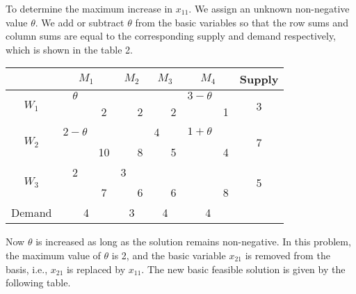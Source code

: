 \documentclass[../main-sheet.tex]{subfiles}
\begin{document}
To determine the maximum increase in \(x_{11}\). We assign an unknown non-negative value \(\theta\). We add or subtract \(\theta\) from the basic variables so that the row sums and column sums are equal to the corresponding supply and demand respectively, which is shown in the table 2.
\begin{table}[H]
    \centering
    \begin{tabular}{|c|cc|cc|cc|cc|c|}
    \hline
                           & \multicolumn{2}{c|}{$M_1$} & \multicolumn{2}{c|}{$M_2$} & \multicolumn{2}{c|}{$M_3$} & \multicolumn{2}{c|}{$M_4$} & Supply             \\ \hline
    \multirow{2}{*}{$W_1$} & $\theta$              &    &                        &   &                        &   & $3-\theta$             &   & \multirow{2}{*}{3} \\ \cline{3-3} \cline{5-5} \cline{7-7} \cline{9-9}
                           & \multicolumn{1}{c|}{} & 2  & \multicolumn{1}{c|}{}  & 2 & \multicolumn{1}{c|}{}  & 2 & \multicolumn{1}{c|}{}  & 1 &                    \\ \hline
    \multirow{2}{*}{$W_2$} & $2-\theta$            &    &                        &   & 4                      &   & $1+\theta$             &   & \multirow{2}{*}{7} \\ \cline{3-3} \cline{5-5} \cline{7-7} \cline{9-9}
                           & \multicolumn{1}{c|}{} & 10 & \multicolumn{1}{c|}{}  & 8 & \multicolumn{1}{c|}{}  & 5 & \multicolumn{1}{c|}{}  & 4 &                    \\ \hline
    \multirow{2}{*}{$W_3$} & 2                     &    & 3                      &   &                        &   &                        &   & \multirow{2}{*}{5} \\ \cline{3-3} \cline{5-5} \cline{7-7} \cline{9-9}
                           & \multicolumn{1}{c|}{} & 7  & \multicolumn{1}{c|}{}  & 6 & \multicolumn{1}{c|}{}  & 6 & \multicolumn{1}{c|}{}  & 8 &                    \\ \hline
    Demand                 & \multicolumn{2}{c|}{4}     & \multicolumn{2}{c|}{3}     & \multicolumn{2}{c|}{4}     & \multicolumn{2}{c|}{4}     &                    \\ \hline
    \end{tabular}
    \end{table}
    Now \(\theta\) is increased as long as the solution remains non-negative. In this problem, the maximum value of \(\theta\) is 2, and the basic variable \(x_{21}\) is removed from the basis, i.e., \(x_{21}\) is replaced by \(x_{11}\). The new basic feasible solution is given by the following table.
\end{document}
